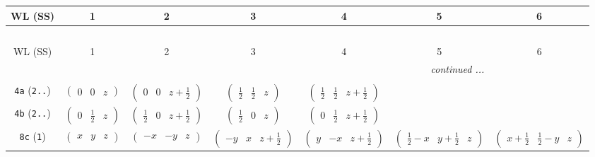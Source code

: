 \documentclass[fleqn,9pt,landscape]{jsarticle}
\begin{document}
\begin{center}
\renewcommand{\arraystretch}{1.2}
\begin{longtable}{ccccccc}
 \hline \hline
WL (SS) & 1 & 2 & 3 & 4 & 5 & 6 \\ \hline \endfirsthead

\multicolumn{6}{l}{\tablename\ \thetable{}} \\
 \hline \hline
WL (SS) & 1 & 2 & 3 & 4 & 5 & 6 \\ \hline \endhead

 \hline \hline
\multicolumn{6}{r}{\footnotesize\it continued ...} \\ \endfoot

 \hline \hline
\multicolumn{6}{r}{} \\ \endlastfoot

{\tt 4a} ({\tt 2..}) & $ \begin{pmatrix} 0 & 0 & z \end{pmatrix} $ & $ \begin{pmatrix} 0 & 0 & z + \frac{1}{2} \end{pmatrix} $ & $ \begin{pmatrix} \frac{1}{2} & \frac{1}{2} & z \end{pmatrix} $ & $ \begin{pmatrix} \frac{1}{2} & \frac{1}{2} & z + \frac{1}{2} \end{pmatrix} $ & $  $ & $  $ \\ \hline
{\tt 4b} ({\tt 2..}) & $ \begin{pmatrix} 0 & \frac{1}{2} & z \end{pmatrix} $ & $ \begin{pmatrix} \frac{1}{2} & 0 & z + \frac{1}{2} \end{pmatrix} $ & $ \begin{pmatrix} \frac{1}{2} & 0 & z \end{pmatrix} $ & $ \begin{pmatrix} 0 & \frac{1}{2} & z + \frac{1}{2} \end{pmatrix} $ & $  $ & $  $ \\ \hline
{\tt 8c} ({\tt 1}) & $ \begin{pmatrix} x & y & z \end{pmatrix} $ & $ \begin{pmatrix} - x & - y & z \end{pmatrix} $ & $ \begin{pmatrix} - y & x & z + \frac{1}{2} \end{pmatrix} $ & $ \begin{pmatrix} y & - x & z + \frac{1}{2} \end{pmatrix} $ & $ \begin{pmatrix} \frac{1}{2} - x & y + \frac{1}{2} & z \end{pmatrix} $ & $ \begin{pmatrix} x + \frac{1}{2} & \frac{1}{2} - y & z \end{pmatrix} $ \\

\end{longtable}
\end{center}
\end{document}
